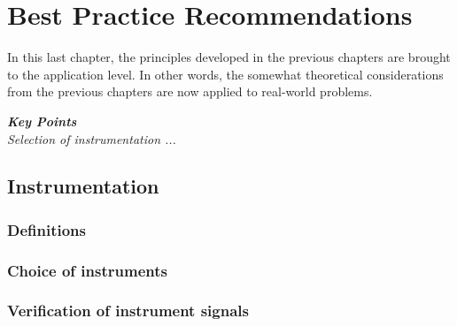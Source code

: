 \chapter{Best Practice Recommendations {\color{magenta}{Contributing author: }}}
\label{ch:bestpractice}

\noindent{}

In this last chapter, the principles developed in the previous chapters are brought to the application level. In other words, the somewhat theoretical considerations from the previous chapters are now applied to real-world problems. 


\noindent\begin{tcolorbox}
\parbox{\textwidth}{
\emph{\textbf{Key Points}\\
Selection of instrumentation ...
}}
\end{tcolorbox}


\section{Instrumentation {\color{magenta}{Contributing author: }}}
 
    \subsection{Definitions }
 
    \subsection{Choice of instruments }
 
    \subsection{Verification of instrument signals }
    
